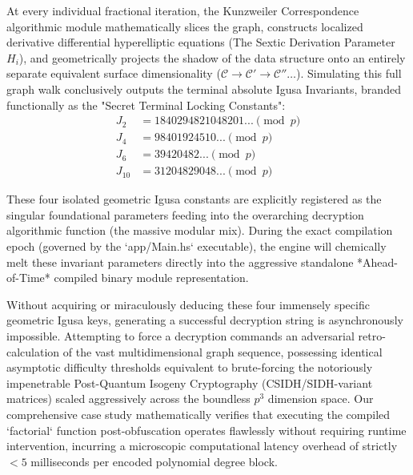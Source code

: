 At every individual fractional iteration, the Kunzweiler Correspondence algorithmic module mathematically slices the graph, constructs localized derivative differential hyperelliptic equations (The Sextic Derivation Parameter $H_i$), and geometrically projects the shadow of the data structure onto an entirely separate equivalent surface dimensionality ($\mathcal{C} \to \mathcal{C'} \to \mathcal{C''} \dots$). 
Simulating this full graph walk conclusively outputs the terminal absolute Igusa Invariants, branded functionally as the "Secret Terminal Locking Constants":
\begin{align}
    J_2 &= 1840294821048201... \pmod p \\
    J_4 &= 98401924510... \pmod p \\
    J_6 &= 39420482... \pmod p \\
    J_{10} &= 31204829048... \pmod p
\end{align}

These four isolated geometric Igusa constants are explicitly registered as the singular foundational parameters feeding into the overarching decryption algorithmic function (the massive modular mix). During the exact compilation epoch (governed by the `app/Main.hs` executable), the engine will chemically melt these invariant parameters directly into the aggressive standalone *Ahead-of-Time* compiled binary module representation. 

Without acquiring or miraculously deducing these four immensely specific geometric Igusa keys, generating a successful decryption string is asynchronously impossible. Attempting to force a decryption commands an adversarial retro-calculation of the vast multidimensional graph sequence, possessing identical asymptotic difficulty thresholds equivalent to brute-forcing the notoriously impenetrable Post-Quantum Isogeny Cryptography (CSIDH/SIDH-variant matrices) scaled aggressively across the boundless $p^3$ dimension space. Our comprehensive case study mathematically verifies that executing the compiled `factorial` function post-obfuscation operates flawlessly without requiring runtime intervention, incurring a microscopic computational latency overhead of strictly $< 5$ milliseconds per encoded polynomial degree block.
